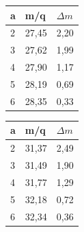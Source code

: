 \begin{center}
\begin{minipage}{0.25\textwidth}		
\begin{tabular}{l|l|l}
a & m/q & $\Delta m$\\	
\hline		
2 & 27,45 & 2,20\\
3 & 27,62 & 1,99\\
4 & 27,90 & 1,17\\
5 & 28,19 & 0,69\\
6 & 28,35 & 0,33\\
\end{tabular}
\end{minipage}
\begin{minipage}{0.25\textwidth}
\begin{tabular}{l|l|l}
a & m/q & $\Delta m$\\
\hline
2 &	31,37 &	2,49\\
3 & 31,49 &	1,90\\
4 & 31,77 &	1,29\\
5 & 32,18 &	0,72\\
6 & 32,34 &	0,36\\
\end{tabular}
\end{minipage}
\end{center}

